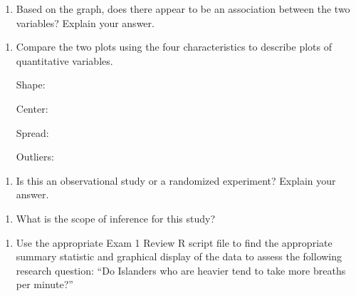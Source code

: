 \documentclass[
]{report}
\providecommand{\tightlist}{%
  \setlength{\itemsep}{0pt}\setlength{\parskip}{0pt}}
\begin{document}
\begin{enumerate}
\def\labelenumi{\alph{enumi}.}
\setcounter{enumi}{7}
\tightlist
\item
  Based on the graph, does there appear to be an association between the two variables? Explain your answer.
\end{enumerate}

\vspace{0.8in}

\begin{enumerate}
\def\labelenumi{\roman{enumi}.}
\item
  Compare the two plots using the four characteristics to describe plots of quantitative variables.
  \vspace{0.1in}

  Shape:
  \vspace{0.2in}

  Center:
  \vspace{0.2in}

  Spread:
  \vspace{0.2in}

  Outliers:
  \vspace{0.2in}
\end{enumerate}

\begin{enumerate}
\def\labelenumi{\alph{enumi}.}
\setcounter{enumi}{9}
\tightlist
\item
  Is this an observational study or a randomized experiment? Explain your answer.
\end{enumerate}

\vspace{0.5in}

\begin{enumerate}
\def\labelenumi{\alph{enumi}.}
\setcounter{enumi}{10}
\tightlist
\item
  What is the scope of inference for this study?
\end{enumerate}

\newpage

\begin{enumerate}
\def\labelenumi{\arabic{enumi}.}
\setcounter{enumi}{6}
\tightlist
\item
  Use the appropriate Exam 1 Review R script file to find the appropriate summary statistic and graphical display of the data to assess the following research question: ``Do Islanders who are heavier tend to take more breaths per minute?''
\end{enumerate}
\end{document}
